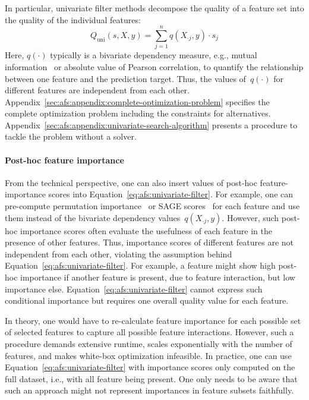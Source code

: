 \documentclass{article}
\theoremstyle{definition}
\begin{document}
In particular, univariate filter methods decompose the quality of a feature set into the quality of the individual features:
%
\begin{equation}
	Q_{\text{uni}}(s,X,y) = \sum_{j=1}^{n} q(X_{\cdot{}j},y) \cdot s_j
	\label{eq:afs:univariate-filter}
\end{equation}
%
Here, $q(\cdot)$ typically is a bivariate dependency measure, e.g., mutual information~\cite{kraskov2004estimating} or absolute value of Pearson correlation, to quantify the relationship between one feature and the prediction target.
Thus, the values of~$q(\cdot)$ for different features are independent from each other.
Appendix~\ref{sec:afs:appendix:complete-optimization-problem} specifies the complete optimization problem including the constraints for alternatives.
Appendix~\ref{sec:afs:appendix:univariate-search-algorithm} presents a procedure to tackle the problem without a solver.

\paragraph{Post-hoc feature importance}

From the technical perspective, one can also insert values of post-hoc feature-importance scores into Equation~\ref{eq:afs:univariate-filter}.
For example, one can pre-compute permutation importance~\cite{breiman2001random} or SAGE scores~\cite{covert2020understanding} for each feature and use them instead of the bivariate dependency values~$q(X_{\cdot{}j},y)$.
However, such post-hoc importance scores often evaluate the usefulness of each feature in the presence of other features.
Thus, importance scores of different features are not independent from each other, violating the assumption behind Equation~\ref{eq:afs:univariate-filter}.
For example, a feature might show high post-hoc importance if another feature is present, due to feature interaction, but low importance else.
Equation~\ref{eq:afs:univariate-filter} cannot express such conditional importance but requires one overall quality value for each feature.

In theory, one would have to re-calculate feature importance for each possible set of selected features to capture all possible feature interactions.
However, such a procedure demands extensive runtime, scales exponentially with the number of features, and makes white-box optimization infeasible.
In practice, one can use Equation~\ref{eq:afs:univariate-filter} with importance scores only computed on the full dataset, i.e., with all feature being present.
One only needs to be aware that such an approach might not represent importances in feature subsets faithfully.
\end{document}
